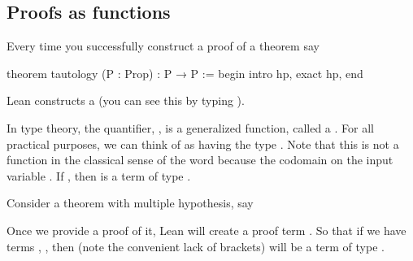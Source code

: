\documentclass[letterpaper,10pt,english]{sphinxmanual}
\begin{document}
\subsection{Proofs as functions}
\label{\detokenize{day2:proofs-as-functions}}
\sphinxAtStartPar
Every time you successfully construct a proof of a theorem say

\begin{sphinxVerbatim}[commandchars=\\\{\}]
theorem tautology (P : Prop) : P → P :=
begin
  intro hp,
  exact hp,
end
\end{sphinxVerbatim}

\sphinxAtStartPar
Lean constructs a  
(you can see this by typing ).

\sphinxAtStartPar
In type theory, the  quantifier, , is a generalized function, called a .
For all practical purposes, we can think of  as having the type .
Note that this is not a function in the classical sense of the word because the codomain   on the input variable .
If , then  is a term of type  .

\sphinxAtStartPar
Consider a theorem with multiple hypothesis, say

\begin{sphinxVerbatim}[commandchars=\\\{\}]
            
\end{sphinxVerbatim}

\sphinxAtStartPar
Once we provide a proof of it, Lean will create a proof term
.
So that if we have terms , , 
then  (note the convenient lack of brackets) will be a term of type .
\end{document}
